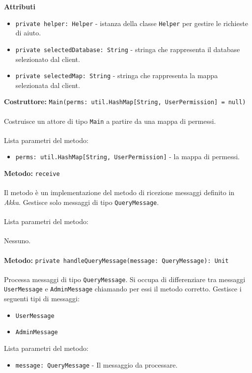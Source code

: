 \documentclass[a4paper]{article}
\begin{document}
		\textbf{Attributi}
			\begin{itemize}
				\item \texttt{private helper: Helper} - istanza della classe \texttt{Helper} per gestire le richieste di aiuto.
				\item \texttt{private selectedDatabase: String} - stringa che rappresenta il database selezionato dal client.
				\item \texttt{private selectedMap: String} - stringa che rappresenta la mappa selezionata dal client.
			\end{itemize}
		\textbf{Costruttore: }\texttt{Main(perms: util.HashMap[String, UserPermission] = null)}
			\\ \\
			Costruisce un attore di tipo \texttt{Main} a partire da una mappa di permessi.
			\\ \\
			Lista parametri del metodo:
			\begin{itemize}
				\item \texttt{perms: util.HashMap[String, UserPermission]} - la mappa di permessi.
			\end{itemize}
		\textbf{Metodo: }\texttt{receive}
			\\ \\
			Il metodo è un implementazione del metodo di ricezione messaggi definito in \emph{Akka}. Gestisce solo messaggi di tipo \texttt{QueryMessage}.
			\\ \\
			Lista parametri del metodo:
			\\ \\
			Nessuno.
			\\ \\
		\textbf{Metodo: }\texttt{private handleQueryMessage(message: QueryMessage): Unit}
			\\ \\
			Processa messaggi di tipo \texttt{QueryMessage}. Si occupa di differenziare tra messaggi \texttt{UserMessage} e \texttt{AdminMessage} chiamando per essi il metodo corretto.
			Gestisce i seguenti tipi di messaggi:
			\begin{itemize}
				\item \texttt{UserMessage}
				\item \texttt{AdminMessage}
			\end{itemize}
			Lista parametri del metodo:
			\begin{itemize}
				\item \texttt{message: QueryMessage} - Il messaggio da processare.
			\end{itemize}
\end{document}
